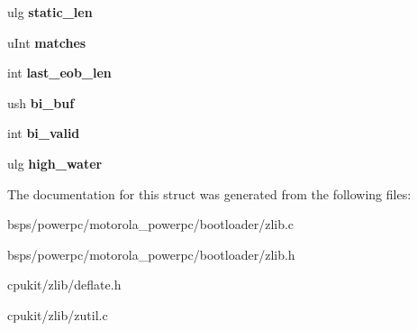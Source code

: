 \begin{DoxyCompactItemize}
\mbox{\label{structinternal__state_a8a83e269866761afa3a7b4641ba5ff91}} 
ulg {\bfseries static\+\_\+len}
\item 
\mbox{\label{structinternal__state_ac0f10ec7237615f6b632f2f4d14872ef}} 
u\+Int {\bfseries matches}
\item 
\mbox{\label{structinternal__state_abf71c5672f4fce10f6f6a99eb30f72e1}} 
int {\bfseries last\+\_\+eob\+\_\+len}
\item 
\mbox{\label{structinternal__state_a6880946d081053778f5f544b04603d13}} 
ush {\bfseries bi\+\_\+buf}
\item 
\mbox{\label{structinternal__state_a241f3606e41a3aa0ef22868a41bd9a0f}} 
int {\bfseries bi\+\_\+valid}
\item 
\mbox{\label{structinternal__state_a85439cd585435b2590039339139d25cb}} 
ulg {\bfseries high\+\_\+water}
\end{DoxyCompactItemize}


The documentation for this struct was generated from the following files\+:\begin{DoxyCompactItemize}
\item 
bsps/powerpc/motorola\+\_\+powerpc/bootloader/zlib.\+c\item 
bsps/powerpc/motorola\+\_\+powerpc/bootloader/zlib.\+h\item 
cpukit/zlib/deflate.\+h\item 
cpukit/zlib/zutil.\+c\end{DoxyCompactItemize}
